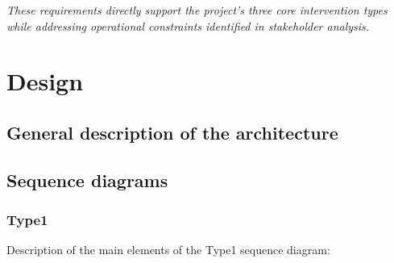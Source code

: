 \documentclass[11.5pt]{article}
\begin{document}
    \noindent\textit{These requirements directly support the project's three core intervention types while addressing operational constraints identified in stakeholder analysis.}

    \newpage
    \section{Design}
    \subsection{General description of the architecture}
    \subsection{Sequence diagrams}
    \subsubsection{Type1}
    Description of the main elements of the Type1 sequence diagram:
\end{document}
